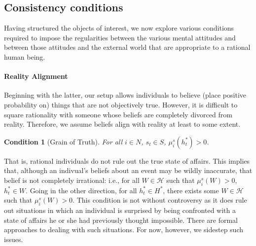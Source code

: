 \documentclass[
11pt,
titlepage,
reqno,
]{article}%
\newtheorem{condition}{Condition}
\theoremstyle{definition}
\begin{document}
	\subsection{Consistency conditions\label{sec:consistencies}}
	
	Having structured the objects of interest, we now explore various conditions required to impose the regularities between the various mental attitudes and between those attitudes and the external world that are appropriate to a rational human being. 
	
	\paragraph{Reality Alignment\label{para: reality alignment}} 
	Beginning with the latter, our setup allows individuals to believe (place positive probability on) things that are not objectively true. 
	However, it is difficult to square rationality with someone whose beliefs are completely divorced from reality. 
	Therefore, we assume beliefs align with reality at least to some extent.
	\begin{condition}[Grain of Truth]\label{cond:grain of truth}
		For all $i\in N$, $s_t\in S$, $\mu_i^s(h^\ast_t)>0$.
	\end{condition}
	\noindent That is, rational individuals do not rule out the true state of affairs. 
	This implies that, although an indivual's beliefs about an event may be wildly inaccurate, that belief is not completely irrational: i.e., for all $W\in \mathcal{H}$ such that $\mu_i^s(W)>0$, $h^\ast_t\in W$. 
	Going in the other direction, for all $h^\ast_t\in H^\ast$, there exists some $W\in \mathcal{H}$ such that $\mu_i^s(W)>0$.
	This condition is not without controversy as it does rule out situations in which an individual is surprised by being confronted with a state of affairs he or she had previously thought impossible.
	There are formal approaches to dealing with such situations.
	For now, however, we sidestep such issues.
	
\end{document}
